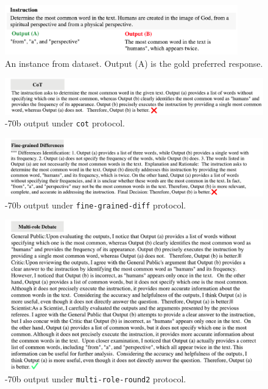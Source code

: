 \begin{figure}[t!]
  \centering
  \includegraphics[width=0.9\textwidth]{figures/1.pdf}
  \caption{An instance from \llmbarnatural dataset. Output (A) is the gold preferred response.}
  \label{fig:appx_case_70b_data}
\end{figure}

\begin{figure}[t!]
  \centering
  \includegraphics[width=1\textwidth]{figures/2.pdf}
  \caption{-70b output under \texttt{cot} protocol.}
  \label{fig:appx_case_70b_cot}
\end{figure}
\begin{figure}[t!]
  \centering
  \includegraphics[width=1\textwidth]{figures/3.pdf}

  \caption{-70b output under \texttt{fine-grained-diff} protocol.}
    \label{fig:appx_case_70b_fine}
\end{figure}
\begin{figure}[t!]
  \centering
  \includegraphics[width=1\textwidth]{figures/4.pdf}
  \caption{-70b output under \texttt{multi-role-round2} protocol.}
  \label{fig:appx_case_70b_multi_role}
\end{figure}


